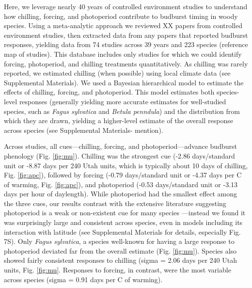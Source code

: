\documentclass{article}
\begin{document}
\par Here, we leverage nearly 40 years of controlled environment studies to understand how chilling, forcing, and photoperiod contribute to budburst timing in woody species. Using a meta-analytic approach we reviewed XX papers from controlled environment studies, then extracted data from any papers that reported budburst responses, yielding data from 74 studies across 39 years and 223 species (reference map of studies). This database includes only studies for which we could identify forcing, photoperiod, and chilling treatments quantitatively. As chilling was rarely reported, we estimated chilling (when possible) using local climate data (see Supplemental Materials). We used a Bayesian hierarchical model to estimate the effects of chilling, forcing, and photoperiod. This model estimates both species-level responses (generally yielding more accurate estimates for well-studied species, such as \emph{Fagus sylvatica} and \emph{Betula penndula}) and the distribution from which they are drawn, yielding a higher-level estimate of the overall response across species (see Supplemental Materials- mention).\\ %


\par Across studies, all cues---chilling, forcing, and photoperiod---advance budburst phenology (Fig. \ref {fig:mu}). Chilling was the strongest cue (-2.86 days/standard unit or -8.87 days per 240 Utah units, which is typically about 10 days of chilling, Fig. \ref {fig:apc}), followed by forcing (-0.79 days/standard unit or -4.37 days per \degree C of warming, Fig. \ref {fig:apc}), and photoperiod (-0.53 days/standard unit or -3.13 days per hour of daylength). While photoperiod had the smallest effect among the three cues, our results contrast with the extensive literature suggesting photoperiod is a weak or non-existent cue for many species \citep{zohner2016,koerner2010a}---instead we found it was surprisingly large and consistent across species, even in models including its interaction with latitude (see Supplemental Materials for details, especially Fig. 7S). Only \emph{Fagus sylvatica}, a species well-known for having a large response to photoperiod deviated far from the overall estimate (Fig. \ref {fig:mu}). Species also showed fairly consistent responses to chilling (sigma = 2.06 days per 240 Utah units, Fig. \ref {fig:mu}.
Responses to forcing, in contrast, were the most variable across species (sigma = 0.91 days per \degree C of warming).
\end{document}
